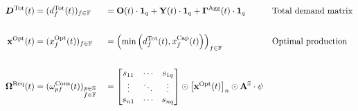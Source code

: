 \documentclass[main.tex]{subfiles}
\begin{document}
{ \small
  \begin{alignat*}{4}
    \bm{D}^{\textrm{Tot}}(t) &= (d_{f}^{\textrm{Tot}}(t))_{f \in \firmsset} &&=
                                                                               \ioorders(t)
                                                                               \cdot
                                                                               \irowsum{q}
                                                                               +
                                                                               \ioy(t)
                                                                               \cdot
                                                                               \irowsum{q}
                                                                               +
                                                                               \Damage^{\textrm{Agg}}(t)
    \cdot \irowsum{q} && \text{Total demand matrix} \\
                                 & && &&\\
    \iox^{\textrm{Opt}}(t) &= (x^{\textrm{Opt}}_{f}(t))_{f \in \firmsset} &&= \left ( \min \left ( d^{\textrm{Tot}}_{f}(t), x^{\textrm{Cap}}_{f}(t) \right ) \right )_{f \in \firmsset} && \text{Optimal production}\\
                                 & && &&\\
    \ioinv^{\textrm{Req}}(t) &= (\omega^{\textrm{Cons}}_{pf}(t))_{\substack{p \in \sectorsset\\f \in \firmsset}} &&=
                                                                                                                  \begin{bmatrix}
                                                                                                                    s_{11} & \cdots & s_{1q} \\
                                                                                                                    \vdots & \ddots & \vdots\\
                                                                                                                    s_{n1} & \cdots & s_{nq}
                                                                                                                  \end{bmatrix}
                                                                                                                  \odot \begin{bmatrix} \iox^{\textrm{Opt}}(t) \end{bmatrix}_{n} \odot \ioa^{\sectorsset} \cdot \psi &                                    & \\

\end{alignat*}}
\end{document}
